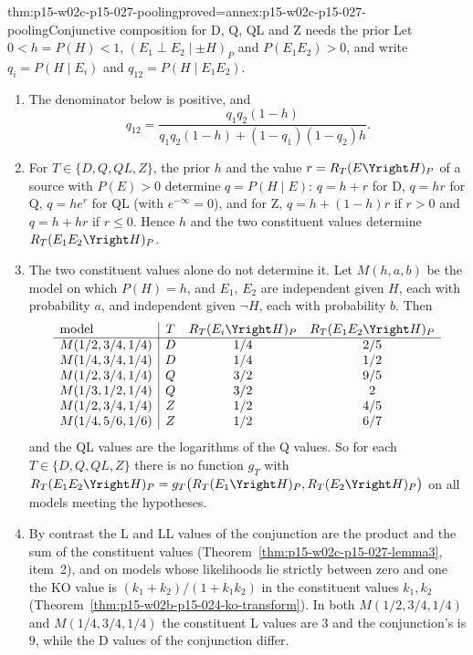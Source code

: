 \begin{hbtheorem}{thm:p15-w02c-p15-027-pooling}{proved=annex:p15-w02c-p15-027-pooling}{Conjunctive composition for D, Q, QL and Z needs the prior}
Let \(0<h=P(H)<1\), \((E_1\perp E_2\mid\pm H)_P\) and \(P(E_1E_2)>0\), and
write \(q_i=P(H\mid E_i)\) and \(q_{12}=P(H\mid E_1E_2)\).
\begin{enumerate}
\item The denominator below is positive, and
  \[
   q_{12}=\frac{q_1q_2(1-h)}{q_1q_2(1-h)+(1-q_1)(1-q_2)h}.
  \]
\item For \(T\in\{D,Q,QL,Z\}\), the prior \(h\) and the value
  \(r=R_T(E\Yright H)_P\) of a source with \(P(E)>0\) determine
  \(q=P(H\mid E)\): \(q=h+r\) for D, \(q=hr\) for Q, \(q=he^{r}\) for QL
  (with \(e^{-\infty}=0\)), and for Z, \(q=h+(1-h)r\) if \(r>0\) and
  \(q=h+hr\) if \(r\leq0\). Hence \(h\) and the two constituent values
  determine \(R_T(E_1E_2\Yright H)_P\).
\item The two constituent values alone do not determine it. Let
  \(M(h,a,b)\) be the model on which \(P(H)=h\), and \(E_1\), \(E_2\) are
  independent given \(H\), each with probability \(a\), and independent
  given \(\neg H\), each with probability \(b\). Then
  \[
  \begin{array}{l|ccc}
   \text{model} & T & R_T(E_i\Yright H)_P & R_T(E_1E_2\Yright H)_P\\\hline
   M(1/2,3/4,1/4) & D & 1/4 & 2/5\\
   M(1/4,3/4,1/4) & D & 1/4 & 1/2\\
   M(1/2,3/4,1/4) & Q & 3/2 & 9/5\\
   M(1/3,1/2,1/4) & Q & 3/2 & 2\\
   M(1/2,3/4,1/4) & Z & 1/2 & 4/5\\
   M(1/4,5/6,1/6) & Z & 1/2 & 6/7
  \end{array}
  \]
  and the QL values are the logarithms of the Q values. So for each
  \(T\in\{D,Q,QL,Z\}\) there is no function \(g_T\) with
  \(R_T(E_1E_2\Yright H)_P=g_T\bigl(R_T(E_1\Yright H)_P,R_T(E_2\Yright H)_P\bigr)\)
  on all models meeting the hypotheses.
\item By contrast the L and LL values of the conjunction are the product
  and the sum of the constituent values
  (Theorem~\ref{thm:p15-w02c-p15-027-lemma3}, item~2), and on models
  whose likelihoods lie strictly between zero and one the KO value is
  \((k_1+k_2)/(1+k_1k_2)\) in the constituent values \(k_1,k_2\)
  (Theorem~\ref{thm:p15-w02b-p15-024-ko-transform}). In both
  \(M(1/2,3/4,1/4)\) and \(M(1/4,3/4,1/4)\) the constituent L values are
  \(3\) and the conjunction's is \(9\), while the D values of the
  conjunction differ.
\end{enumerate}
\end{hbtheorem}

